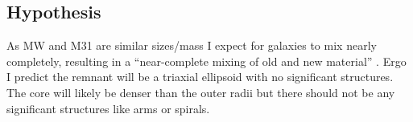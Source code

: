 \documentclass[linenumbers,trackchanges]{aastex7}
\begin{document}
\subsection{Hypothesis}

As MW and M31 are similar sizes/mass I expect for galaxies to mix nearly completely, resulting in a “near-complete mixing of old and new material” \cite{Frenk_2012}. Ergo I predict the remnant will be a triaxial ellipsoid with no significant structures. The core will likely be denser than the outer radii but there should not be any significant structures like arms or spirals.





\end{document}
